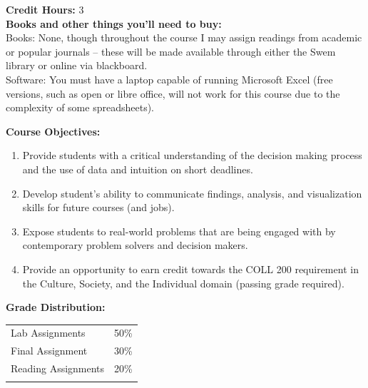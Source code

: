 \documentclass[11pt]{article}
\begin{document}
\textbf {Credit Hours:} 3 \\

\textbf {\large Books and other things you'll need to buy:}\\ 

Books: None, though throughout the course I may assign readings from academic or popular journals – these will be made available through either the Swem library or online via blackboard.\\
Software: You must have a laptop capable of running Microsoft Excel (free versions, such as open or libre office, will not work for this course due to the complexity of some spreadsheets).


\vspace{8mm}

\textbf {\large Course Objectives:} 
\begin{enumerate} \itemsep-0.4em
  \item Provide students with a critical understanding of the decision making process and the use of data and intuition on short deadlines.
  \item Develop student’s ability to communicate findings, analysis, and visualization skills for future courses (and jobs).
  \item Expose students to real-world problems that are being engaged with by contemporary problem solvers and decision makers.
  \item Provide an opportunity to earn credit towards the COLL 200 requirement in the Culture, Society, and the Individual domain (passing grade required).
\end{enumerate}
\vspace{8mm}

\textbf {\large Grade Distribution:} \\
\hspace*{40mm}
\begin{tabular}{ l l }
Lab Assignments & 50\% \\
Final Assignment & 30\%\\
Reading Assignments & 20\%\\ \\
\end{tabular} \\\\
\end{document}
